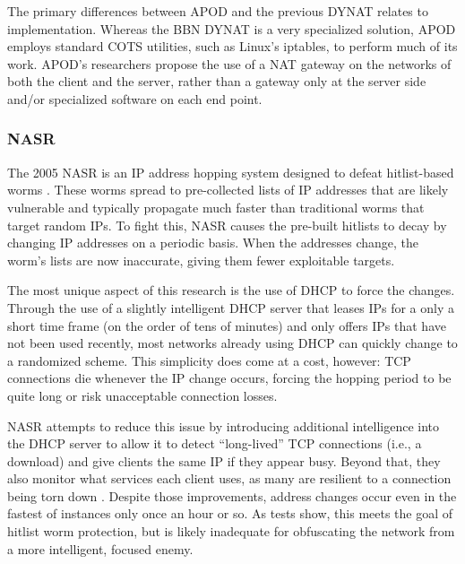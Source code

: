 \par The primary differences between APOD and the previous DYNAT relates to implementation. Whereas the BBN DYNAT is a very specialized solution, \ac{APOD} employs standard \ac{COTS} utilities, such as Linux's iptables, to perform much of its work. \ac{APOD}'s researchers propose the use of a \ac{NAT} gateway on the networks of both the client and the server, rather than a gateway only at the server side and/or specialized software on each end point.

\subsubsection{\acf{NASR}}
\par The 2005 \acf{NASR} is an \ac{IP} address hopping system designed to defeat hitlist-based worms \cite{NASR}. These worms spread to pre-collected lists of \ac{IP} addresses that are likely vulnerable and typically propagate much faster than traditional worms that target random \acp{IP}. To fight this, \ac{NASR} causes the pre-built hitlists to decay by changing IP addresses on a periodic basis. When the addresses change, the worm's lists are now inaccurate, giving them fewer exploitable targets.

\par The most unique aspect of this research is the use of \ac{DHCP} to force the changes. Through the use of a slightly intelligent \ac{DHCP} server that leases \acp{IP} for a only a short time frame (on the order of tens of minutes) and only offers \acp{IP} that have not been used recently, most networks already using DHCP can quickly change to a randomized scheme. This simplicity does come at a cost, however: \ac{TCP} connections die whenever the IP change occurs, forcing the hopping period to be quite long or risk unacceptable connection losses.

\par \ac{NASR} attempts to reduce this issue by introducing additional intelligence into the DHCP server to allow it to detect ``long-lived'' TCP connections (i.e., a download) and give clients the same IP if they appear busy. Beyond that, they also monitor what services each client uses, as many are resilient to a connection being torn down \cite{NASR}. Despite those improvements, address changes occur even in the fastest of instances only once an hour or so. As tests show, this meets the goal of hitlist worm protection, but is likely inadequate for obfuscating the network from a more intelligent, focused enemy.

